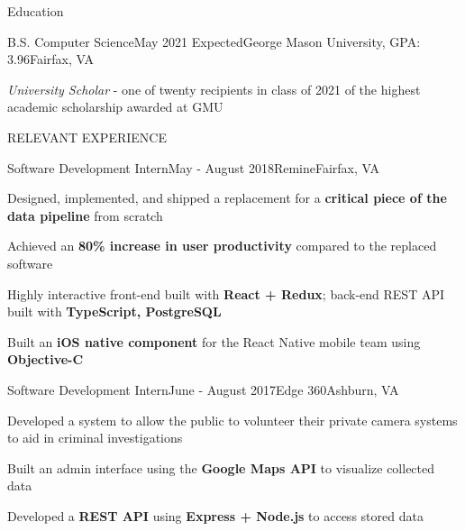 \documentclass{resume} %
\begin{document}

\begin{rSection}{Education}
\begin{rSubsection}{B.S. Computer Science}{May 2021 Expected}{George Mason University, GPA: 3.96}{Fairfax, VA}

  \item \emph{University Scholar} - one of twenty recipients in class of 2021 of the highest academic scholarship awarded at GMU

\end{rSubsection}
\end{rSection}


\begin{rSection}{RELEVANT EXPERIENCE}

\begin{rSubsection}{Software Development Intern}{May - August 2018}{Remine}{Fairfax, VA} 

  \item Designed, implemented, and shipped a replacement for a \textbf{critical piece of the data pipeline} from scratch
  \item Achieved an \textbf{80\% increase in user productivity} compared to the replaced software
  \item Highly interactive front-end built with \textbf{React + Redux}; back-end REST API built with \textbf{TypeScript, PostgreSQL}
  \item Built an \textbf{iOS native component} for the React Native mobile team using \textbf{Objective-C}
  
\end{rSubsection}

\begin{rSubsection}{Software Development Intern}{June - August 2017}{Edge 360}{Ashburn, VA} 

  \item Developed a system to allow the public to volunteer their private camera systems to aid in criminal investigations
  \item Built an admin interface using the \textbf{Google Maps API} to visualize collected data
  \item Developed a \textbf{REST API} using \textbf{Express + Node.js} to access stored data
  
\end{rSubsection} 

\end{rSection}
\end{document}
